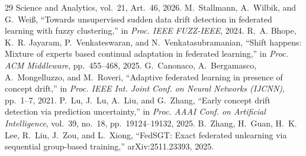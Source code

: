 \documentclass[conference]{IEEEtran}
\begin{document}
\begin{thebibliography}{29}
{Science and Analytics}, vol.~21, Art.~46, 2026.
 M.~Stallmann, A.~Wilbik, and G.~Wei{\ss}, ``Towards
unsupervised sudden data drift detection in federated learning with fuzzy
clustering,'' in \emph{Proc. IEEE FUZZ-IEEE}, 2024.
 R.~A. Bhope, K.~R. Jayaram, P.~Venkateswaran, and
N.~Venkatasubramanian, ``Shift happens: Mixture of experts based continual
adaptation in federated learning,'' in \emph{Proc. ACM Middleware},
pp.~455--468, 2025.
 G.~Canonaco, A.~Bergamasco, A.~Mongelluzzo, and
M.~Roveri, ``Adaptive federated learning in presence of concept drift,'' in
\emph{Proc. IEEE Int. Joint Conf. on Neural Networks (IJCNN)},
pp.~1--7, 2021.
 P.~Lu, J.~Lu, A.~Liu, and G.~Zhang, ``Early concept drift
detection via prediction uncertainty,'' in \emph{Proc. AAAI Conf. on
Artificial Intelligence}, vol.~39, no.~18, pp.~19124--19132, 2025.
 B.~Zhang, H.~Guan, H.~K. Lee, R.~Liu, J.~Zou, and
L.~Xiong, ``FedSGT: Exact federated unlearning via sequential group-based
training,'' arXiv:2511.23393, 2025.
\end{thebibliography}
\end{document}
